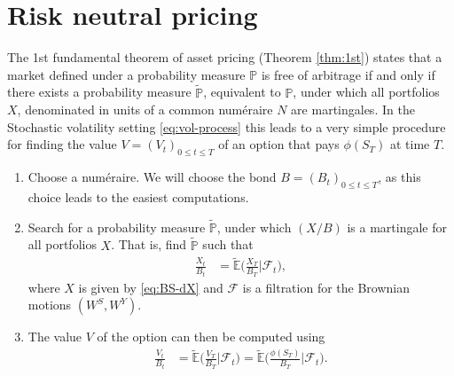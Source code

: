 \documentclass[12pt]{book}
\numberwithin{equation}{chapter}
\theoremstyle{plain}
\numberwithin{theorem}{section}
\theoremstyle{definition}
\numberwithin{exercise}{chapter}
\newcommand{\<}{\langle}
\renewcommand{\>}{\rangle}
\renewcommand{\(}{\left(}
\renewcommand{\)}{\right)}
\renewcommand{\[}{\left[}
\renewcommand{\]}{\right]}
\newcommand\Eb{\mathds{E}}
\newcommand\Pb{\mathds{P}}
\newcommand\Fc{\mathscr{F}}
\newcommand\Ebt{\widetilde{\Eb}}
\newcommand\Pbt{\widetilde{\Pb}}
\theoremstyle{definition}
\numberwithin{question}{section}
\begin{document}
\section{Risk neutral pricing}

The 1st fundamental theorem of asset pricing (Theorem \ref{thm:1st}) states that a market defined under a probability measure $\Pb$ is free of arbitrage if and only if there exists a probability measure $\Pbt$, equivalent to $\Pb$, under which all portfolios $X$, denominated in units of a common num\'eraire $N$ are martingales.  
In the Stochastic volatility setting \eqref{eq:vol-process} this leads to a very simple procedure for finding the value $V = (V_t)_{0 \leq t \leq T}$ of an option that pays $\phi(S_T)$ at time $T$.

\begin{enumerate}
\item Choose a num\'eraire.  We will choose the bond $B=(B_t)_{0 \leq t \leq T}$, as this choice leads to the easiest computations.
\item Search for a probability measure $\Pbt$, under which $(X/B)$ is a martingale for all portfolios $X$.  That is, find $\Pbt$ such that
\begin{align}
\frac{X_t}{B_t}
	&=	\Ebt \Big( \frac{X_T}{B_T} \Big| \Fc_t \Big) , 
\end{align} 
where $X$ is given by \eqref{eq:BS-dX} and $\Fc$ is a filtration for the Brownian motions $(W^S,W^Y)$.
\item The value $V$ of the option can then be computed using
\begin{align}
\frac{V_t}{B_t}
	&=	\Ebt \Big( \frac{V_T}{B_T} \Big| \Fc_t \Big) 
	 = 	\Ebt \Big( \frac{\phi(S_T)}{B_T} \Big| \Fc_t \Big) . 
\end{align}
\end{enumerate}
\end{document}
